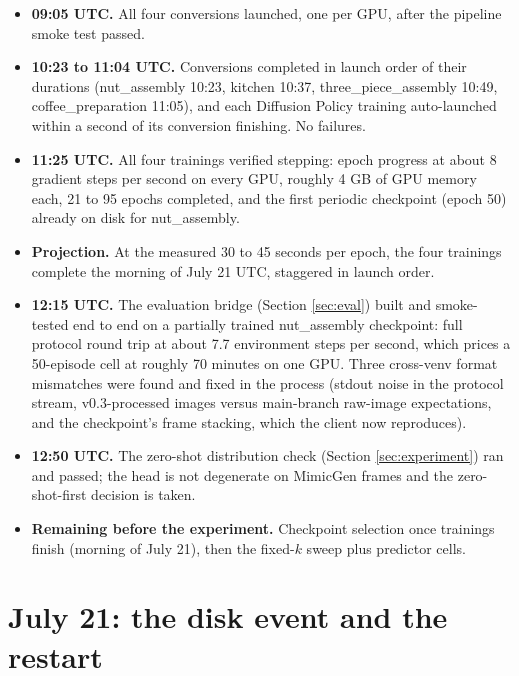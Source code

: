 \documentclass[11pt]{article}
\begin{document}
\begin{itemize}[leftmargin=2em]
  \item \textbf{09:05 UTC.} All four conversions launched, one per GPU, after
        the pipeline smoke test passed.
  \item \textbf{10:23 to 11:04 UTC.} Conversions completed in launch order of
        their durations (nut\_assembly 10:23, kitchen 10:37,
        three\_piece\_assembly 10:49, coffee\_preparation 11:05), and each
        Diffusion Policy training auto-launched within a second of its
        conversion finishing. No failures.
  \item \textbf{11:25 UTC.} All four trainings verified stepping: epoch
        progress at about 8 gradient steps per second on every GPU, roughly
        4 GB of GPU memory each, 21 to 95 epochs completed, and the first
        periodic checkpoint (epoch 50) already on disk for nut\_assembly.
  \item \textbf{Projection.} At the measured 30 to 45 seconds per epoch, the
        four trainings complete the morning of July 21 UTC, staggered in
        launch order.
  \item \textbf{12:15 UTC.} The evaluation bridge (Section \ref{sec:eval})
        built and smoke-tested end to end on a partially trained
        nut\_assembly checkpoint: full protocol round trip at about 7.7
        environment steps per second, which prices a 50-episode cell at
        roughly 70 minutes on one GPU. Three cross-venv format mismatches
        were found and fixed in the process (stdout noise in the protocol
        stream, v0.3-processed images versus main-branch raw-image
        expectations, and the checkpoint's frame stacking, which the client
        now reproduces).
  \item \textbf{12:50 UTC.} The zero-shot distribution check (Section
        \ref{sec:experiment}) ran and passed; the head is not degenerate on
        MimicGen frames and the zero-shot-first decision is taken.
  \item \textbf{Remaining before the experiment.} Checkpoint selection once
        trainings finish (morning of July 21), then the fixed-$k$ sweep plus
        predictor cells.
\end{itemize}

\section{July 21: the disk event and the restart}
\label{sec:incident}
\end{document}

